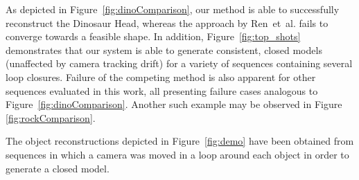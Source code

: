 As depicted in Figure~\ref{fig:dinoComparison}, our method is able to successfully reconstruct the Dinosaur Head, whereas the approach by Ren~et~al. fails to converge towards a feasible shape.
In addition, Figure~\ref{fig:top_shots} demonstrates that our system is able to generate consistent, closed models (unaffected by camera tracking drift) for a variety of sequences containing several loop closures.
Failure of the competing method %
is also apparent for other sequences evaluated in this work, all presenting failure cases analogous to Figure~\ref{fig:dinoComparison}. %
Another such example may be observed in Figure \ref{fig:rockComparison}.

The object reconstructions depicted in Figure~\ref{fig:demo} have been obtained from sequences in which a camera was moved in a loop around each object in order to generate a closed model.

